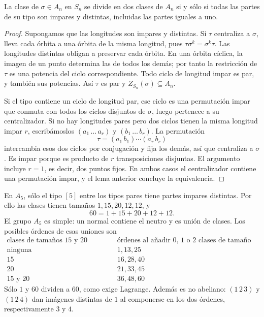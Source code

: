 \begin{prop}\label{prop:C9-division}
La clase de $\sigma\in A_n$ en $S_n$ se divide en dos clases de $A_n$ si y sólo si todas las partes de su tipo son impares y distintas, incluidas las partes iguales a uno.
\end{prop}
\begin{proof}
Supongamos que las longitudes son impares y distintas. Si $\tau$ centraliza a $\sigma$, lleva cada órbita a una órbita de la misma longitud, pues $\tau\sigma^k=\sigma^k\tau$. Las longitudes distintas obligan a preservar cada órbita. En una órbita cíclica, la imagen de un punto determina las de todos los demás; por tanto la restricción de $\tau$ es una potencia del ciclo correspondiente. Todo ciclo de longitud impar es par, y también sus potencias. Así $\tau$ es par y $Z_{S_n}(\sigma)\subseteq A_n$.

Si el tipo contiene un ciclo de longitud par, ese ciclo es una permutación impar que conmuta con todos los ciclos disjuntos de $\sigma$, luego pertenece a su centralizador. Si no hay longitudes pares pero dos ciclos tienen la misma longitud impar $r$, escribámoslos $(a_1\,\ldots\,a_r)$ y $(b_1\,\ldots\,b_r)$. La permutación
\[
\tau=(a_1\,b_1)\cdots(a_r\,b_r)
\]
intercambia esos dos ciclos por conjugación y fija los demás, así que centraliza a $\sigma$. Es impar porque es producto de $r$ transposiciones disjuntas. El argumento incluye $r=1$, es decir, dos puntos fijos. En ambos casos el centralizador contiene una permutación impar, y el lema anterior concluye la equivalencia.
\end{proof}

\begin{ejem}
En $A_5$, sólo el tipo $[5]$ entre los tipos pares tiene partes impares distintas. Por ello las clases tienen tamaños $1,15,20,12,12$, y
\[
60=1+15+20+12+12.
\]
El grupo $A_5$ es simple: un normal contiene el neutro y es unión de clases. Los posibles órdenes de esas uniones son
\begingroup
\renewcommand{\arraystretch}{1.2}
\[
\begin{array}{c|l}
\text{clases de tamaños 15 y 20 elegidas}&\text{órdenes al añadir 0, 1 o 2 clases de tamaño 12}\\[2pt]\hline
\text{ninguna}&1,13,25\\
15&16,28,40\\
20&21,33,45\\
15\text{ y }20&36,48,60
\end{array}
\]
\endgroup
Sólo $1$ y $60$ dividen a $60$, como exige Lagrange. Además es no abeliano: $(1\,2\,3)$ y $(1\,2\,4)$ dan imágenes distintas de $1$ al componerse en los dos órdenes, respectivamente $3$ y $4$.
\end{ejem}

